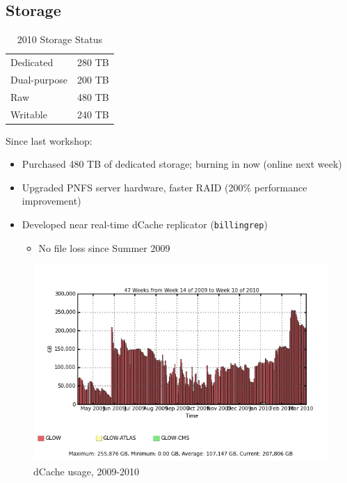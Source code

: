 \documentclass{beamer}
\begin{document}
\subsection{Storage}
\begin{frame}
\begin{table}
\begin{tabular}{lr}
	\toprule
	Dedicated			&	 280 TB \\	 %
	Dual-purpose	&	 200 TB \\	 %
	\midrule
	Raw						&	 480 TB \\
	Writable			&	 240 TB \\
	\bottomrule
\end{tabular}
\caption{2010 Storage Status}
\label{2010_storage_status}
\end{table}

Since last workshop:
\begin{itemize}
	\item Purchased 480 TB of dedicated storage; burning in now (online next week)
	\item Upgraded PNFS server hardware, faster RAID (200\% performance improvement)
	\item Developed near real-time dCache replicator ({\tt billingrep})
	\begin{itemize}
		\item No file loss since Summer 2009
	\end{itemize}
\end{itemize}
\end{frame}

\begin{frame}
\begin{figure}
    \includegraphics[width=\textwidth]{Graphics/se_space_free.png}
    \caption{dCache usage, 2009-2010}
\end{figure}
\end{frame}
\end{document}
